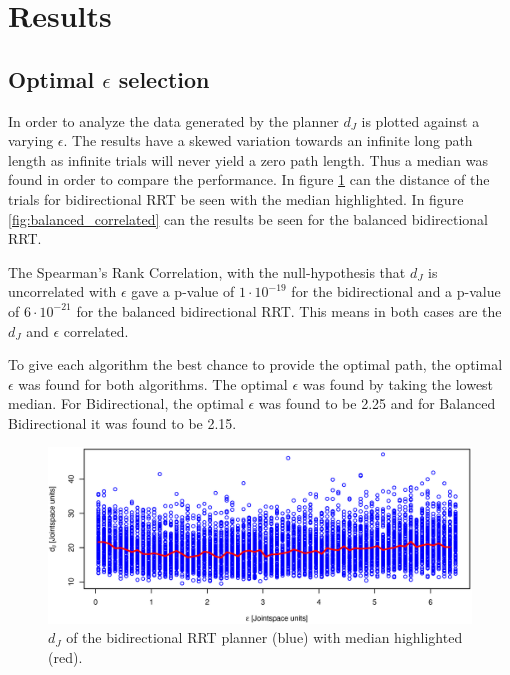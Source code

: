 \section{Results} 
\subsection{Optimal \(\epsilon\) selection}

In order to analyze the data generated by the planner \(d_J\) is plotted against a varying \(\epsilon\).
The results have a skewed variation towards an infinite long path length as infinite trials will never yield a zero path length.
Thus a median was found in order to compare the performance.
In figure \ref{fig:bidir_correlated} can the distance of the trials for bidirectional RRT be seen with the median highlighted.
In figure \ref{fig:balanced_correlated} can the results be seen for the balanced bidirectional RRT.

The Spearman's Rank Correlation, with the null-hypothesis that \(d_J\) is uncorrelated with \(\epsilon\) gave a p-value of \(1\cdot 10^{-19}\) for the bidirectional and a p-value of \(6\cdot 10^{-21}\) for the balanced bidirectional RRT.
This means in both cases are the \(d_J\) and \(\epsilon\) correlated.

To give each algorithm the best chance to provide the optimal path, the optimal \(\epsilon\) was found for both algorithms.
The optimal \(\epsilon\) was found by taking the lowest median.
For Bidirectional, the optimal \(\epsilon\) was found to be 2.25 and for Balanced Bidirectional it was found to be 2.15.

\begin{figure}[h]
 \centering
 \includegraphics[width=\figsize]{graphics/bidirectional_correlation}
 \caption{\(d_J\) of the bidirectional RRT planner (blue) with median highlighted (red).}
 \label{fig:bidir_correlated}
\end{figure}

